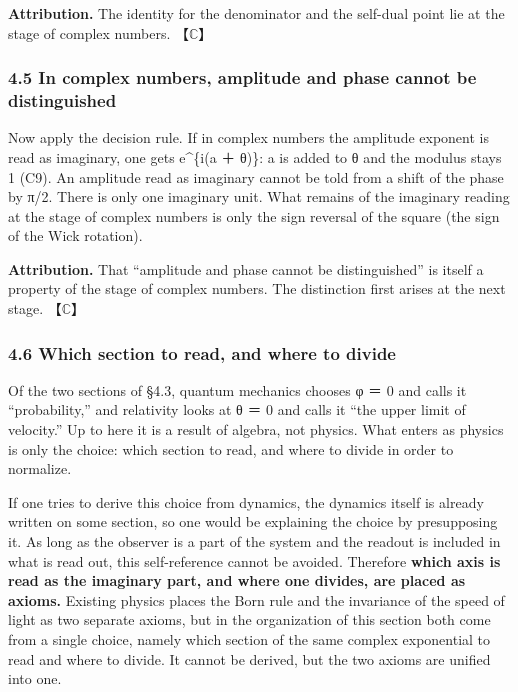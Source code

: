 \documentclass[
  a4paper,
]{article}
\begin{document}
\textbf{Attribution.} The identity for the denominator and the self-dual
point lie at the stage of complex numbers. 【\(\mathbb{C}\)】

\subsubsection{4.5 In complex numbers, amplitude and phase cannot be
distinguished}\label{in-complex-numbers-amplitude-and-phase-cannot-be-distinguished}

Now apply the decision rule. If in complex numbers the amplitude
exponent is read as imaginary, one gets e\^{}\{i(a ＋ θ)\}: a is added
to θ and the modulus stays 1 (C9). An amplitude read as imaginary cannot
be told from a shift of the phase by π/2. There is only one imaginary
unit. What remains of the imaginary reading at the stage of complex
numbers is only the sign reversal of the square (the sign of the Wick
rotation).

\textbf{Attribution.} That ``amplitude and phase cannot be
distinguished'' is itself a property of the stage of complex numbers.
The distinction first arises at the next stage. 【\(\mathbb{C}\)】

\subsubsection{4.6 Which section to read, and where to
divide}\label{which-section-to-read-and-where-to-divide}

Of the two sections of §4.3, quantum mechanics chooses φ ＝ 0 and calls
it ``probability,'' and relativity looks at θ ＝ 0 and calls it ``the
upper limit of velocity.'' Up to here it is a result of algebra, not
physics. What enters as physics is only the choice: which section to
read, and where to divide in order to normalize.

If one tries to derive this choice from dynamics, the dynamics itself is
already written on some section, so one would be explaining the choice
by presupposing it. As long as the observer is a part of the system and
the readout is included in what is read out, this self-reference cannot
be avoided. Therefore \textbf{which axis is read as the imaginary part,
and where one divides, are placed as axioms.} Existing physics places
the Born rule and the invariance of the speed of light as two separate
axioms, but in the organization of this section both come from a single
choice, namely which section of the same complex exponential to read and
where to divide. It cannot be derived, but the two axioms are unified
into one.
\end{document}

